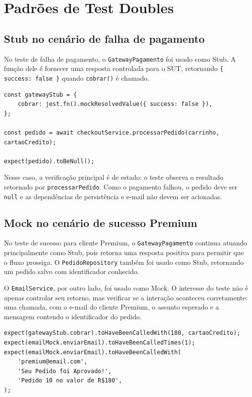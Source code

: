 \documentclass[
    12pt,
    openright,
    oneside,
    a4paper,
    chapter=TITLE,
    section=TITLE,
    brazil,
]{abntex2}
\begin{document}
\chapter{Padr\~oes de Test Doubles}

\section{Stub no cen\'ario de falha de pagamento}

No teste de falha de pagamento, o \texttt{GatewayPagamento} foi usado como Stub. A fun\c{c}\~ao dele \'e fornecer uma resposta controlada para o SUT, retornando \texttt{\{ success: false \}} quando \texttt{cobrar()} \'e chamado.

\begin{lstlisting}[style=javascript,caption={Stub para falha de pagamento}]
const gatewayStub = {
    cobrar: jest.fn().mockResolvedValue({ success: false }),
};

const pedido = await checkoutService.processarPedido(carrinho, cartaoCredito);

expect(pedido).toBeNull();
\end{lstlisting}

Nesse caso, a verifica\c{c}\~ao principal \'e de estado: o teste observa o resultado retornado por \texttt{processarPedido}. Como o pagamento falhou, o pedido deve ser \texttt{null} e as depend\^encias de persist\^encia e e-mail n\~ao devem ser acionadas.

\section{Mock no cen\'ario de sucesso Premium}

No teste de sucesso para cliente Premium, o \texttt{GatewayPagamento} continua atuando principalmente como Stub, pois retorna uma resposta positiva para permitir que o fluxo prossiga. O \texttt{PedidoRepository} tamb\'em foi usado como Stub, retornando um pedido salvo com identificador conhecido.

O \texttt{EmailService}, por outro lado, foi usado como Mock. O interesse do teste n\~ao \'e apenas controlar seu retorno, mas verificar se a intera\c{c}\~ao aconteceu corretamente: uma chamada, com o e-mail do cliente Premium, o assunto esperado e a mensagem contendo o identificador do pedido.

\begin{lstlisting}[style=javascript,caption={Verifica\c{c}\~ao de comportamento com Mock}]
expect(gatewayStub.cobrar).toHaveBeenCalledWith(180, cartaoCredito);
expect(emailMock.enviarEmail).toHaveBeenCalledTimes(1);
expect(emailMock.enviarEmail).toHaveBeenCalledWith(
    'premium@email.com',
    'Seu Pedido foi Aprovado!',
    'Pedido 10 no valor de R$180',
);
\end{lstlisting}
\end{document}

